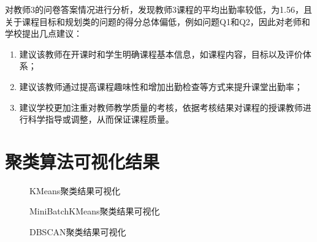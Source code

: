 \documentclass{acm_proc_article-sp}
\begin{document}
对教师3的问卷答案情况进行分析，发现教师3课程的平均出勤率较低，为1.56，且关于课程目标和规划类的问题的得分总体偏低，例如问题Q1和Q2，因此对老师和学校提出几点建议：
\begin{enumerate}
       \item 建议该教师在开课时和学生明确课程基本信息，如课程内容，目标以及评价体系；
       \item 建议该教师通过提高课程趣味性和增加出勤检查等方式来提升课堂出勤率；
       \item 建议学校更加注重对教师教学质量的考核，依据考核结果对课程的授课教师进行科学指导或调整，从而保证课程质量。
\end{enumerate}


%
%
\clearpage


\appendix
\section{\textsf{聚类算法可视化结果}}
\begin{figure}[!h]
\centering
{}
\caption{KMeans聚类结果可视化}
\label{PKM}
\end{figure}
\begin{figure}[!h]
\centering
{}
\caption{MiniBatchKMeans聚类结果可视化}
\label{PMK}
\end{figure}
\begin{figure}[!h]
\centering
{}
\caption{DBSCAN聚类结果可视化}
\label{PDS}
\end{figure}
\balancecolumns
\end{document}
